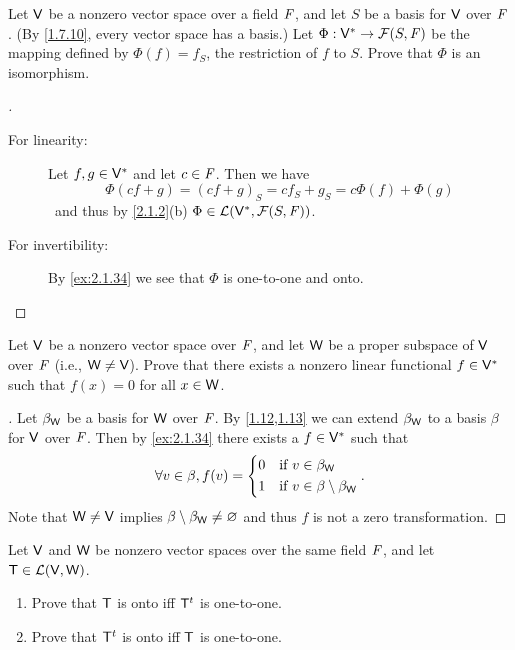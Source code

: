 \begin{ex}\label{ex:2.6.18}
	Let \(\mathsf{V}\) be a nonzero vector space over a field \(\mathit{F}\), and let \(S\) be a basis for \(\mathsf{V}\) over \(\mathit{F}\).
	(By \cref{1.7.10}, every vector space has a basis.)
	Let \(\Phi : \mathsf{V}^* \to \mathcal{F}(S, \mathit{F})\) be the mapping defined by \(\Phi(f) = f_S\), the restriction of \(f\) to \(S\).
	Prove that \(\Phi\) is an isomorphism.
\end{ex}

\begin{proof}[]
	\begin{description}
		\item[For linearity:]
			Let \(f, g \in \mathsf{V}^*\) and let \(c \in \mathit{F}\).
			Then we have
			\[
				\Phi(cf + g) = (cf + g)_S = c f_S + g_S = c \Phi(f) + \Phi(g)
			\]\
			and thus by \cref{2.1.2}(b) \(\Phi \in \mathcal{L}(\mathsf{V}^*, \mathcal{F}(S, \mathit{F}))\).
		\item[For invertibility:]
			By \cref{ex:2.1.34} we see that \(\Phi\) is one-to-one and onto.
	\end{description}
\end{proof}

\begin{ex}\label{ex:2.6.19}
	Let \(\mathsf{V}\) be a nonzero vector space over \(\mathit{F}\), and let \(\mathsf{W}\) be a proper subspace of \(\mathsf{V}\) over \(\mathit{F}\)
	(i.e., \(\mathsf{W} \neq \mathsf{V}\)).
	Prove that there exists a nonzero linear functional \(f \in \mathsf{V}^*\) such that \(f(x) = 0\) for all \(x \in \mathsf{W}\).
\end{ex}

\begin{proof}[]
	Let \(\beta_{\mathsf{W}}\) be a basis for \(\mathsf{W}\) over \(\mathit{F}\).
	By \cref{1.12,1.13} we can extend \(\beta_{\mathsf{W}}\) to a basis \(\beta\) for \(\mathsf{V}\) over \(\mathit{F}\).
	Then by \cref{ex:2.1.34} there exists a \(f \in \mathsf{V}^*\) such that
	\[
		\forall v \in \beta, f(v) = \begin{dcases}
			0 & \text{if } v \in \beta_{\mathsf{W}}                 \\
			1 & \text{if } v \in \beta \setminus \beta_{\mathsf{W}}
		\end{dcases}.
	\]
	Note that \(\mathsf{W} \neq \mathsf{V}\) implies \(\beta \setminus \beta_{\mathsf{W}} \neq \varnothing\) and thus \(f\) is not a zero transformation.
\end{proof}

\begin{ex}\label{ex:2.6.20}
	Let \(\mathsf{V}\) and \(\mathsf{W}\) be nonzero vector spaces over the same field \(\mathit{F}\), and let \(\mathsf{T} \in \mathcal{L}(\mathsf{V}, \mathsf{W})\).
	\begin{enumerate}
		\item Prove that \(\mathsf{T}\) is onto iff \({\mathsf{T}}^{t}\) is one-to-one.
		\item Prove that \({\mathsf{T}}^{t}\) is onto iff \(\mathsf{T}\) is one-to-one.
	\end{enumerate}
\end{ex}

